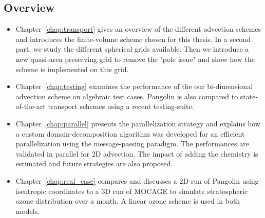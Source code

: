 \subsection*{Overview}
\begin{itemize}
  \item Chapter~\ref{chap:transport} gives an overview of the different
    advection schemes and introduces the finite-volume scheme chosen for this
    thesis. In a second part, we study the different spherical grids available.
    Then we introduce a new quasi-area preserving grid to remove the "pole
    issue" and show how the scheme is implemented on this grid.
  \item Chapter~\ref{chap:testing} examines the performance of the
    our bi-dimensional advection scheme on algebraic test cases. Pangolin is also
    compared to state-of-the-art transport schemes using a recent
    testing-suite.
  \item Chapter~\ref{chap:parallel} presents the parallelization strategy and
    explains how a custom domain-decom\-position algorithm was developed 
    for an efficient parallelization using the message-passing paradigm. The
    performances are validated in parallel for 2D advection. The impact of
    adding the chemistry is estimated and future strategies are also proposed.
  \item Chapter~\ref{chap:real_case} compares and discusses a 2D run of Pangolin
    using isentropic coordinates to a 3D run of MOCAGE to simulate stratospheric
    ozone distribution over a month. A linear ozone scheme is used in both
    models.
\end{itemize}

